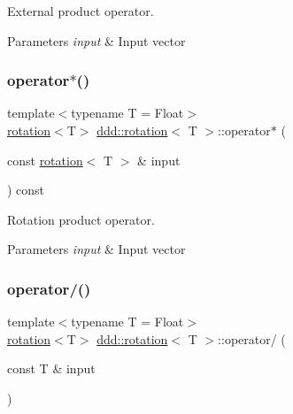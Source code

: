 External product operator. 


\begin{DoxyParams}{Parameters}
{\em input} & Input vector \\
\hline
\end{DoxyParams}
\mbox{\label{classddd_1_1rotation_a974dff537d71eef1dd26420b9b4e087d}} 
\subsubsection{\texorpdfstring{operator$\ast$()}{operator*()}\hspace{0.1cm}{\footnotesize\ttfamily [4/4]}}
{\footnotesize\ttfamily template$<$typename T  = Float$>$ \\
\hyperlink{classddd_1_1rotation}{rotation}$<$T$>$ \hyperlink{classddd_1_1rotation}{ddd\+::rotation}$<$ T $>$\+::operator$\ast$ (\begin{DoxyParamCaption}\item[{const \hyperlink{classddd_1_1rotation}{rotation}$<$ T $>$ \&}]{input }\end{DoxyParamCaption}) const\hspace{0.3cm}{\ttfamily [inline]}}



Rotation product operator. 


\begin{DoxyParams}{Parameters}
{\em input} & Input vector \\
\hline
\end{DoxyParams}
\mbox{\label{classddd_1_1rotation_ac95799a9a25f9653d39ab3339b8085b7}} 
\subsubsection{\texorpdfstring{operator/()}{operator/()}}
{\footnotesize\ttfamily template$<$typename T  = Float$>$ \\
\hyperlink{classddd_1_1rotation}{rotation}$<$T$>$ \hyperlink{classddd_1_1rotation}{ddd\+::rotation}$<$ T $>$\+::operator/ (\begin{DoxyParamCaption}\item[{const T \&}]{input }\end{DoxyParamCaption})\hspace{0.3cm}{\ttfamily [inline]}}



